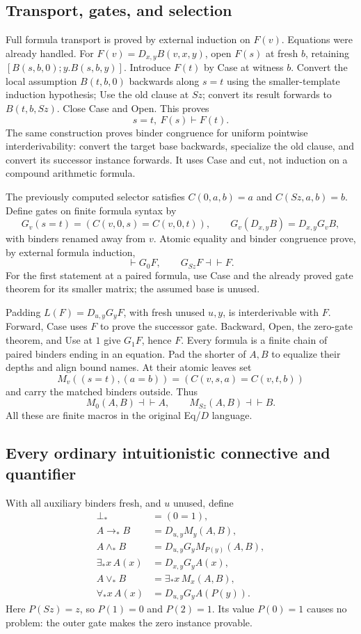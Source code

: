 \subsection{Transport, gates, and selection}

Full formula transport is proved by external induction on $F(v)$.
Equations were already handled. For $F(v)=D_{x,y}B(v,x,y)$, open
$F(s)$ at fresh $b$, retaining $[B(s,b,0);y.B(s,b,y)]$.
Introduce $F(t)$ by Case at witness $b$. Convert the local assumption
$B(t,b,0)$ backwards along $s=t$ using the smaller-template induction
hypothesis; Use the old clause at $Sz$; convert its result forwards to
$B(t,b,Sz)$. Close Case and Open. This proves
\[
                  s=t,\ F(s)\vdash F(t).
\]
The same construction proves binder congruence for uniform pointwise
interderivability: convert the target base backwards, specialize the old
clause, and convert its successor instance forwards. It uses Case and cut,
not induction on a compound arithmetic formula.

The previously computed selector satisfies $C(0,a,b)=a$ and
$C(Sz,a,b)=b$. Define gates on finite formula syntax by
\[
 G_v(s=t)=(C(v,0,s)=C(v,0,t)),\qquad
 G_v(D_{x,y}B)=D_{x,y}G_vB,
\]
with binders renamed away from $v$. Atomic equality and binder congruence
prove, by external formula induction,
\[
                 \vdash G_0F,\qquad G_{Sz}F\dashv\vdash F.
\]
For the first statement at a paired formula, use Case and the already
proved gate theorem for its smaller matrix; the assumed base is unused.

Padding $L(F)=D_{u,y}G_yF$, with fresh unused $u,y$, is interderivable
with $F$. Forward, Case uses $F$ to prove the successor gate. Backward,
Open, the zero-gate theorem, and Use at $1$ give $G_1F$, hence $F$.
Every formula is a finite chain of paired binders ending in an equation.
Pad the shorter of $A,B$ to equalize their depths and align bound names.
At their atomic leaves set
\[
 M_v((s=t),(a=b))=(C(v,s,a)=C(v,t,b))
\]
and carry the matched binders outside. Thus
\[
                M_0(A,B)\dashv\vdash A,\qquad
                M_{Sz}(A,B)\dashv\vdash B.
\tag{Selector endpoints}
\]
All these are finite macros in the original Eq/$D$ language.

\subsection{Every ordinary intuitionistic connective and quantifier}

With all auxiliary binders fresh, and $u$ unused, define
\[
\begin{aligned}
 \bot_*&=(0=1),\\
 A\to_*B&=D_{u,y}M_y(A,B),\\
 A\land_*B&=D_{u,y}G_yM_{P(y)}(A,B),\\
 \exists_*x\,A(x)&=D_{x,y}G_yA(x),\\
 A\lor_*B&=\exists_*x\,M_x(A,B),\\
 \forall_*x\,A(x)&=D_{u,y}G_y A(P(y)).
\end{aligned}
\tag{Logical macros}
\]
Here $P(Sz)=z$, so $P(1)=0$ and $P(2)=1$. Its value $P(0)=1$
causes no problem: the outer gate makes the zero instance provable.

